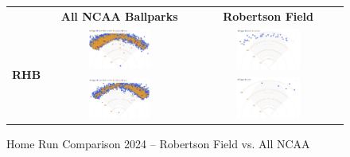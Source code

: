 \documentclass{article}
\begin{document}
\newpage
\begin{figure}[h]
    \centering
    \begin{tabular}{c c c}  
        & \textbf{All NCAA Ballparks} & \textbf{Robertson Field} \\
        \multirow{2}{*}{\textbf{RHB}} &  
        \includegraphics[width=0.45\textwidth]{images/RHB_homers24_NCAA.png} &  
        \includegraphics[width=0.45\textwidth]{images/RHB_homers24_Robertson.png} \\
        \multirow{2}{*}{\textbf{LHB}} &  
        \includegraphics[width=0.45\textwidth]{images/LHB_homers24_NCAA.png} &  
        \includegraphics[width=0.45\textwidth]{images/LHB_homers24_Robertson.png} \\
    \end{tabular}
    \caption{Home Run Comparison 2024 – Robertson Field vs. All NCAA}
    \label{fig:heatmaps}
\end{figure}
\vspace{1cm}
\end{document}
